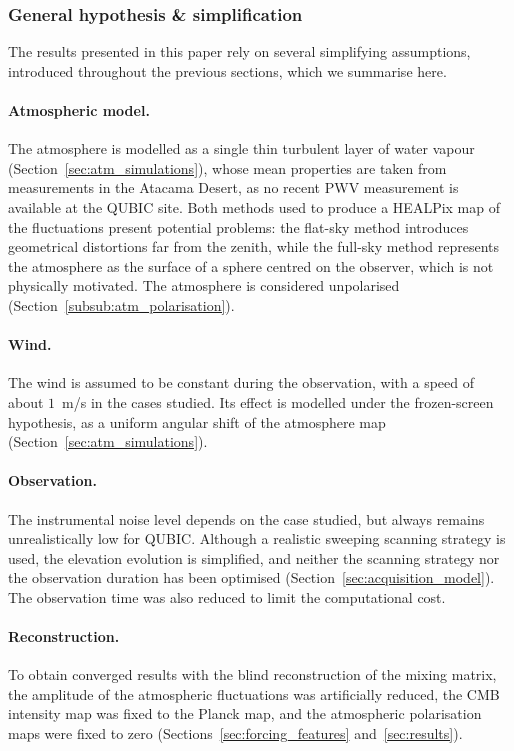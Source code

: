 \documentclass[a4paper,11pt]{article}
\begin{document}
\subsubsection{General hypothesis \& simplification}

The results presented in this paper rely on several simplifying assumptions, introduced throughout the previous sections, which we summarise here.

\paragraph{Atmospheric model.} The atmosphere is modelled as a single thin turbulent layer of water vapour (Section~\ref{sec:atm_simulations}), whose mean properties are taken from measurements in the Atacama Desert, as no recent PWV measurement is available at the QUBIC site. Both methods used to produce a HEALPix map of the fluctuations present potential problems: the flat-sky method introduces geometrical distortions far from the zenith, while the full-sky method represents the atmosphere as the surface of a sphere centred on the observer, which is not physically motivated. The atmosphere is considered unpolarised (Section~\ref{subsub:atm_polarisation}).

\paragraph{Wind.} The wind is assumed to be constant during the observation, with a speed of about $1$~m/s in the cases studied. Its effect is modelled under the frozen-screen hypothesis, as a uniform angular shift of the atmosphere map (Section~\ref{sec:atm_simulations}).

\paragraph{Observation.} The instrumental noise level depends on the case studied, but always remains unrealistically low for QUBIC. Although a realistic sweeping scanning strategy is used, the elevation evolution is simplified, and neither the scanning strategy nor the observation duration has been optimised (Section~\ref{sec:acquisition_model}). The observation time was also reduced to limit the computational cost.

\paragraph{Reconstruction.} To obtain converged results with the blind reconstruction of the mixing matrix, the amplitude of the atmospheric fluctuations was artificially reduced, the CMB intensity map was fixed to the Planck map, and the atmospheric polarisation maps were fixed to zero (Sections~\ref{sec:forcing_features} and~\ref{sec:results}).
\end{document}
